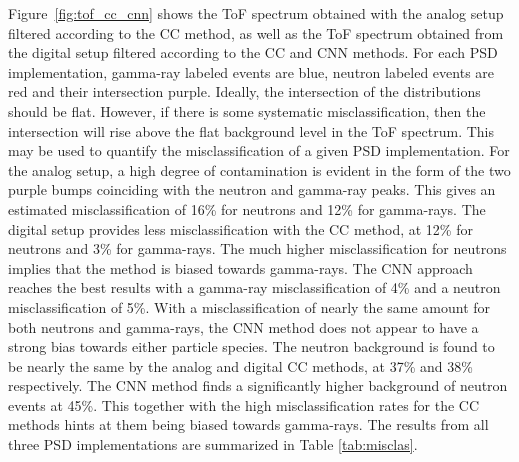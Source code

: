 \documentclass[main.tex]{subfiles}
\begin{document}
Figure~\ref{fig:tof_cc_cnn} shows the ToF spectrum obtained with the analog setup filtered according to the CC method, as well as the ToF spectrum obtained from the digital setup filtered according to the CC and CNN methods.
For each PSD implementation, gamma-ray labeled events are blue, neutron labeled events are red and their intersection purple. 
Ideally, the intersection of the distributions should be flat. However, if there is some systematic misclassification, then the intersection will rise above the flat background level in the ToF spectrum. This may be used to quantify the misclassification of a given PSD implementation.
For the analog setup, a high degree of contamination is evident in the form of the two purple bumps coinciding with the neutron and gamma-ray peaks. This gives an estimated misclassification of 16\% for neutrons and 12\% for gamma-rays. 
The digital setup provides less misclassification with the CC method, at 12\% for neutrons and 3\% for gamma-rays. The much higher misclassification for neutrons implies that the method is biased towards gamma-rays.
The CNN approach reaches the best results with a gamma-ray misclassification of 4\% and a neutron misclassification of 5\%.
With a misclassification of nearly the same amount for both neutrons and gamma-rays, the CNN method does not appear to have a strong bias towards either particle species.
The neutron background is found to be nearly the same by the analog and digital CC methods, at 37\% and 38\% respectively. The CNN method finds a significantly higher background of neutron events at 45\%. This together with the high misclassification rates for the CC methods hints at them being biased towards gamma-rays.
The results from all three PSD implementations are summarized in Table \ref{tab:misclas}.
\end{document}
